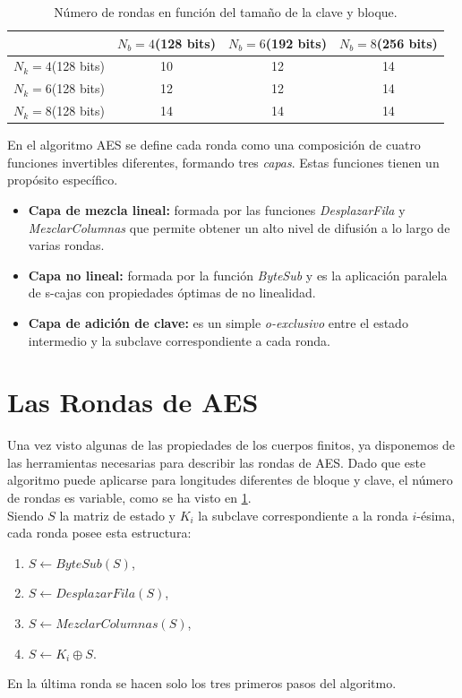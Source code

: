 \begin{table}[htb]
	\begin{center}
		\begin{tabular}{| c | c | c | c |}
				\hline
				& $N_b = 4$(128 bits) & $N_b = 6$(192 bits)& $N_b = 8$(256 bits)\\ \hline
				$N_k = 4$(128 bits)& 10 & 12 & 14\\ \hline
				$N_k = 6$(128 bits)& 12 & 12 & 14\\ \hline
				$N_k = 8$(128 bits)& 14 & 14 & 14\\ \hline
		\end{tabular}
		\caption{Número de rondas en función del tamaño de la clave y bloque.}
		\label{rondas_aes}
	\end{center}
\end{table}

En el algoritmo AES se define cada ronda como una composición de cuatro funciones invertibles diferentes, formando tres \emph{capas}. Estas funciones tienen un propósito específico.
\begin{itemize}
	\item \textbf{Capa de mezcla lineal:} formada por las funciones \emph{DesplazarFila} y \emph{MezclarColumnas} que permite obtener un alto nivel de difusión a lo largo de varias rondas.
	\item \textbf{Capa no lineal:} formada por la función \emph{ByteSub} y es la aplicación paralela de s-cajas con propiedades óptimas de no linealidad.
	\item \textbf{Capa de adición de clave:} es un simple \emph{o-exclusivo} entre el estado intermedio y la subclave correspondiente a cada ronda.
\end{itemize}

\section{Las Rondas de AES}
Una vez visto algunas de las propiedades de los cuerpos finitos, ya disponemos de las herramientas necesarias para describir las rondas de AES.
Dado que este algoritmo puede aplicarse para longitudes diferentes de bloque y clave, el número de rondas es variable, como se ha visto en \ref{rondas_aes}.\\
Siendo $S$ la matriz de estado y $K_i$ la subclave correspondiente a la ronda $i$-ésima, cada ronda posee esta estructura:
\begin{enumerate}
	\item $S \leftarrow ByteSub(S)$,
	\item $S \leftarrow DesplazarFila(S)$,
	\item $S \leftarrow MezclarColumnas(S)$,
	\item $S \leftarrow K_i \oplus S$.
\end{enumerate}
En la última ronda se hacen solo los tres primeros pasos del algoritmo.


